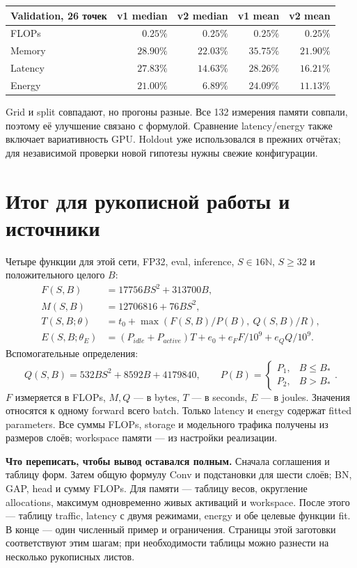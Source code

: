 \documentclass[11pt,a4paper]{article}
\newcommand{\page}[1]{\clearpage\section{#1}}
\begin{document}
\begin{center}\small
\begin{tabular}{lrrrr}
\toprule
Validation, 26 точек & v1 median & v2 median & v1 mean & v2 mean \\
\midrule
FLOPs & $0.25\%$ & $0.25\%$ & $0.25\%$ & $0.25\%$ \\
Memory & $28.90\%$ & $22.03\%$ & $35.75\%$ & $21.90\%$ \\
Latency & $27.83\%$ & $14.63\%$ & $28.26\%$ & $16.21\%$ \\
Energy & $21.00\%$ & $6.89\%$ & $24.09\%$ & $11.13\%$ \\
\bottomrule
\end{tabular}\end{center}
Grid и split совпадают, но прогоны разные. Все 132 измерения памяти
совпали, поэтому её улучшение связано с формулой. Сравнение latency/energy
также включает вариативность GPU. Holdout уже использовался в прежних
отчётах; для независимой проверки новой гипотезы нужны свежие конфигурации.

\page{Итог для рукописной работы и источники}
Четыре функции для этой сети, FP32, eval, inference, $S\in16\mathbb N$,
$S\ge32$ и положительного целого $B$:
\begin{align*}
 \boxed{F(S,B)}&\boxed{=17756BS^2+313700B,}\\[4pt]
 \boxed{M(S,B)}&\boxed{=12706816+76BS^2,}\\[4pt]
 \boxed{T(S,B;\theta)}&\boxed{=t_0+\max(F(S,B)/P(B),\ Q(S,B)/R),}\\[4pt]
 \boxed{E(S,B;\theta_E)}&\boxed{=(P_{idle}+P_{active})T+e_0+e_FF/10^9+e_QQ/10^9.}
\end{align*}
Вспомогательные определения:
\[
 Q(S,B)=532BS^2+8592B+4179840,\qquad
 P(B)=\begin{cases}P_1,&B\le B_*\\P_2,&B>B_*\end{cases}.
\]
$F$ измеряется в FLOPs, $M,Q$ --- в bytes, $T$ --- в seconds, $E$ --- в joules.
Значения относятся к одному forward всего batch. Только latency и energy
содержат fitted parameters. Все суммы FLOPs, storage и модельного трафика
получены из размеров слоёв; workspace памяти --- из настройки реализации.

\textbf{Что переписать, чтобы вывод оставался полным.}
Сначала соглашения и таблицу форм. Затем общую формулу Conv и подстановки
для шести слоёв; BN, GAP, head и сумму FLOPs. Для памяти --- таблицу весов,
округление allocations, максимум одновременно живых активаций и workspace.
После этого --- таблицу traffic, latency с двумя режимами, energy и обе
целевые функции fit. В конце --- один численный пример и ограничения.
Страницы этой заготовки соответствуют этим шагам; при необходимости
таблицы можно разнести на несколько рукописных листов.
\end{document}

